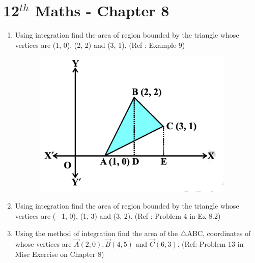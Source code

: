 \documentclass[12pt]{article}
\begin{document}
\section{12$^{th}$ Maths - Chapter 8}
\begin{enumerate}
\item Using integration find the area of region bounded by the triangle whose
vertices are (1, 0), (2, 2) and (3, 1). (Ref : Example 9)

\begin{figure}[!h]
	\includegraphics[width=10cm,height=7cm]{./fig1}
\label{fig:Fig1}
\end{figure}

\item Using integration find the area of region bounded by the triangle whose vertices
are (– 1, 0), (1, 3) and (3, 2). (Ref : Problem 4 in Ex 8.2)

\item Using the method of integration find the area of the $\triangle$ABC, coordinates of whose vertices are $\vec{A}(2, 0), \vec{B}(4, 5) \text{ and }  \vec{C}(6, 3)$. (Ref: Problem 13 in Misc Exercise on Chapter 8)

\end{enumerate}
\end{document}
